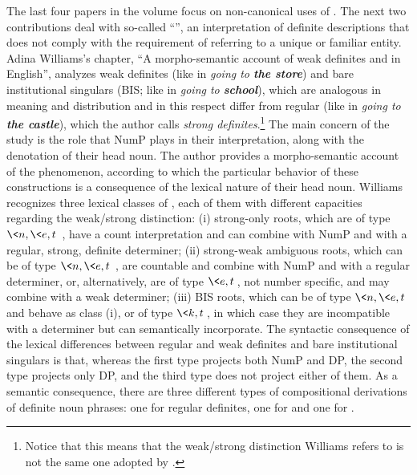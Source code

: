 \documentclass[output=paper]{langsci/langscibook}
\begin{document}
The last four papers in the volume focus on non-canonical uses of . The next two contributions deal with so-called “”, an interpretation of definite descriptions that does not comply with the requirement of referring to a unique or familiar entity. Adina Williams’s chapter, “A morpho-semantic account of weak definites and  in English”, analyzes  weak definites (like in \textit{going to \textbf{the store}}) and bare institutional singulars (BIS; like in \textit{going to \textbf{school}}), which are analogous in meaning and distribution and in this respect differ from regular  (like in \textit{going to \textbf{the castle}}), which the author calls \textit{strong definites}.\footnote{Notice that this means that the weak/strong distinction Williams refers to is not the same one adopted by \citet{Schwarz2009}.}  The main concern of the study is the role that NumP plays in their interpretation, along with the denotation of their head noun. The author provides a morpho-semantic account of the phenomenon, according to which the particular behavior of these constructions is a consequence of the lexical nature of their head noun. Williams recognizes three lexical classes of , each of them with different capacities regarding the weak/strong distinction: (i) strong-only roots, which are of type $ \<n, \<e, t\>\>$, have a count interpretation and can combine with NumP and with a regular, strong, definite determiner; (ii) strong-weak ambiguous roots, which can be of type $ \<n, \<e, t\>\>$, are countable and combine with NumP and with a regular determiner, or, alternatively, are of type $ \<e, t\>$, not number specific, and may combine with a weak determiner; (iii) BIS roots, which can be of type $ \<n, \<e, t\> \>$ and behave as class (i), or of type $ \<k, t\>$, in which case they are incompatible with a determiner but can semantically incorporate. The syntactic consequence of the lexical differences between regular and weak definites and bare institutional singulars is that, whereas the first type projects both NumP and DP, the second type projects only DP, and the third type does not project either of them. As a semantic consequence, there are three different types of compositional derivations of definite noun phrases: one for regular definites, one for  and one for .
\end{document}
